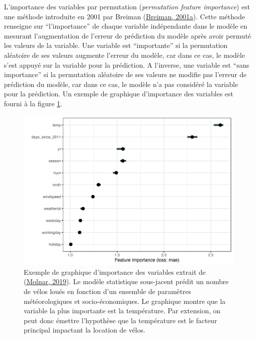 \documentclass[12pt,twoside]{reedthesis}
\begin{document}
L'importance des variables par permutation (\emph{permutation feature importance}) est une méthode introduite en 2001 par Breiman (\protect\hyperlink{ref-breiman_random_2001}{Breiman, 2001a}). Cette méthode renseigne sur ``l'importance'' de chaque variable indépendante dans le modèle en mesurant l'augmentation de l'erreur de prédiction du modèle après avoir permuté les valeurs de la variable. Une variable est ``importante'' si la permutation aléatoire de ses valeurs augmente l'erreur du modèle, car dans ce cas, le modèle s'est appuyé sur la variable pour la prédiction. A l'inverse, une variable est ``sans importance'' si la permutation aléatoire de ses valeurs ne modifie pas l'erreur de prédiction du modèle, car dans ce cas, le modèle n'a pas considéré la variable pour la prédiction. Un exemple de graphique d'importance des variables est fourni à la figure \ref{fig:example-vip}.\\
\begin{figure}

{\centering \includegraphics[width=0.7\linewidth]{figure/importance-bike-1} 

}

\caption[Exemple de graphique d'importance des variables]{Exemple de graphique d'importance des variables extrait de (\protect\hyperlink{ref-molnar_interpretable_2019}{Molnar, 2019}). Le modèle statistique sous-jacent prédit un nombre de vélos loués en fonction d'un ensemble de paramètres météorologiques et socio-économiques. Le graphique montre que la variable la plus importante est la température. Par extension, on peut donc émettre l'hypothèse que la température est le facteur principal impactant la location de vélos.}\label{fig:example-vip}
\end{figure}
\end{document}
